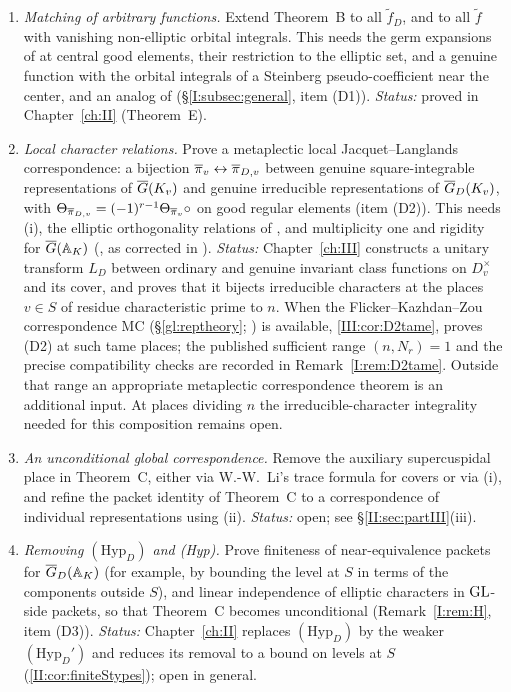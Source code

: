 \begin{enumerate}[label=(\roman*)]
\item \emph{Matching of arbitrary functions.} Extend Theorem~B to all $\tilde f_D$, and to all $\tilde f$ with vanishing non-elliptic orbital integrals. This needs the germ expansions of \cite[\S8]{FK86} at central good elements, their restriction to the elliptic set, and a genuine function with the orbital integrals of a Steinberg pseudo-coefficient near the center, and an analog of \cite[A.3]{DKV84} (\S\ref{I:subsec:general}, item (D1)). \emph{Status:} proved in Chapter~\ref{ch:II} (Theorem~E).
\item \emph{Local character relations.} Prove a metaplectic local Jacquet--Langlands correspondence: a bijection $\overline{\pi}_v\leftrightarrow\overline{\pi}_{D,v}$ between genuine square-integrable representations of $\overline{G}(K_v)$ and genuine irreducible representations of $\overline{G}_D(K_v)$, with $\Theta_{\overline{\pi}_{D,v}}=(-1)^{r-1}\Theta_{\overline{\pi}_v}\circ\relax$ on good regular elements (item (D2)). This needs (i), the elliptic orthogonality relations of \cite[\S\S24--25]{FK86}, and multiplicity one and rigidity for $\overline{G}(\mathbb{A}_K)$ (\cite[\S\S27--28]{FK86}, as corrected in \cite{Zo23}). \emph{Status:} Chapter~\ref{ch:III} constructs a unitary transform $L_D$ between ordinary and genuine invariant class functions on $D_v^\times$ and its cover, and proves that it bijects irreducible characters at the places $v\in S$ of residue characteristic prime to $n$. When the Flicker--Kazhdan--Zou correspondence $\mathrm{MC}$ (\S\ref{gl:reptheory}; \cite[Proposition~3.6, Definition~3.7]{Zo23}) is available, \cref{III:cor:D2tame}, proves (D2) at such tame places; the published sufficient range $(n,N_r)=1$ and the precise compatibility checks are recorded in Remark~\ref{I:rem:D2tame}. Outside that range an appropriate metaplectic correspondence theorem is an additional input. At places dividing $n$ the irreducible-character integrality needed for this composition remains open.
\item \emph{An unconditional global correspondence.} Remove the auxiliary supercuspidal place in Theorem~C, either via W.-W.~Li's trace formula for covers \cite{Li14} or via (i), and refine the packet identity of Theorem~C to a correspondence of individual representations using (ii). \emph{Status:} open; see \S\ref{II:sec:partIII}(iii).
\item \emph{Removing $(\mathrm{Hyp}_D)$ and (Hyp).} Prove finiteness of near-equivalence packets for $\overline{G}_D(\mathbb{A}_K)$ (for example, by bounding the level at $S$ in terms of the components outside $S$), and linear independence of elliptic characters in $\mathrm{GL}$-side packets, so that Theorem~C becomes unconditional (Remark~\ref{I:rem:H}, item (D3)). \emph{Status:} Chapter~\ref{ch:II} replaces $(\mathrm{Hyp}_D)$ by the weaker $(\mathrm{Hyp}_D')$ and reduces its removal to a bound on levels at $S$ (\cref{II:cor:finiteStypes}); open in general.

\end{enumerate}
